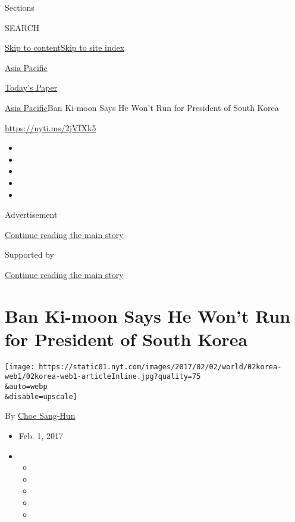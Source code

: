 Sections

SEARCH

\protect\hyperlink{site-content}{Skip to
content}\protect\hyperlink{site-index}{Skip to site index}

\href{https://www.nytimes.com/section/world/asia}{Asia Pacific}

\href{https://myaccount.nytimes.com/auth/login?response_type=cookie\&client_id=vi}{}

\href{https://www.nytimes.com/section/todayspaper}{Today's Paper}

\href{/section/world/asia}{Asia Pacific}\textbar{}Ban Ki-moon Says He
Won't Run for President of South Korea

\url{https://nyti.ms/2jVIXk5}

\begin{itemize}
\item
\item
\item
\item
\item
\end{itemize}

Advertisement

\protect\hyperlink{after-top}{Continue reading the main story}

Supported by

\protect\hyperlink{after-sponsor}{Continue reading the main story}

\hypertarget{ban-ki-moon-says-he-wont-run-for-president-of-south-korea}{%
\section{Ban Ki-moon Says He Won't Run for President of South
Korea}\label{ban-ki-moon-says-he-wont-run-for-president-of-south-korea}}

\texttt{[image: https://static01.nyt.com/images/2017/02/02/world/02korea-web1/02korea-web1-articleInline.jpg?quality=75\\\&auto=webp\\\&disable=upscale]}

By \href{http://www.nytimes.com/by/choe-sang-hun}{Choe Sang-Hun}

\begin{itemize}
\item
  Feb. 1, 2017
\item
  \begin{itemize}
  \item
  \item
  \item
  \item
  \item
  \end{itemize}
\end{itemize}

